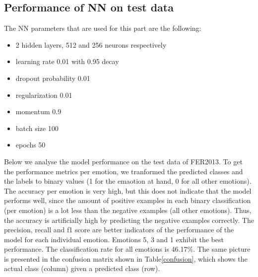 \documentclass[12pt,twoside]{article}
\begin{document}
\subsection{Performance of NN on test data}

The NN parameters that are used for this part are the following:
\begin{itemize}
\item 2 hidden layers, 512 and 256 neurons respectively
\item learning rate 0.01 with 0.95 decay
\item dropout probability 0.01
\item regularization 0.01
\item momentum 0.9
\item batch size 100
\item epochs 50
\end{itemize}
Below we analyse the model performance on the test data of FER2013. To get the performance metrics per emotion, we tranformed the predicted classes and the labels to binary values (1 for the emaotion at hand, 0 for all other emotions). The accuracy per emotion is very high, but this does not indicate that the model performs well, since the amount of positive examples in each binary classification (per emotion) is a lot less than the negative examples (all other emotions). Thus, the accuracy is artificially high by predicting the negative examples correctly. The precision, recall and f1 score are better indicators of the performance of the model for each individual emotion. Emotions 5, 3 and 1 exhibit the best performance. The classification rate for all emotions is 46.17\%. The same picture is presented in the confusion matrix shown in Table\ref{confusion}, which shows the actual class (column) given a predicted class (row).
\end{document}
